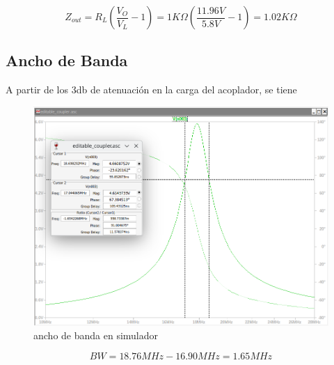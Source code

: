$$
Z_{out} = R_L(\frac{V_O}{V_L}-1)= 1K\Omega(\frac{11.96V}{5.8V}-1)=1.02K\Omega
$$

\subsection{Ancho de Banda}
A partir de los 3db de atenuación en la carga del acoplador, se tiene

\begin{figure}[H]
    \centering
    \includegraphics[width=0.5\linewidth]{fig/bws.png}
    \caption{ancho de banda en simulador}
    \label{fig:enter-label}
\end{figure}

$$
BW = 18.76MHz - 16.90MHz = 1.65MHz
$$



